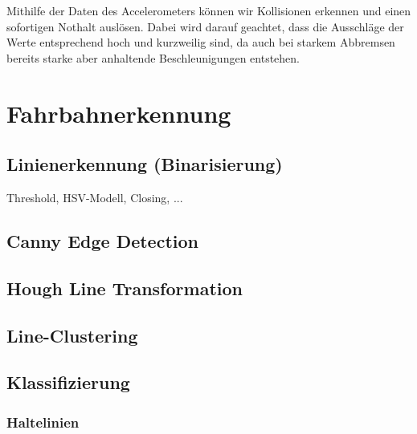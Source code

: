 \documentclass[a4paper,12pt]{report}
\begin{document}
		Mithilfe der Daten des Accelerometers können wir Kollisionen erkennen und einen sofortigen Nothalt auslösen.
		Dabei wird darauf geachtet, dass die Ausschläge der Werte entsprechend hoch und kurzweilig sind, da auch bei starkem Abbremsen bereits starke aber anhaltende Beschleunigungen entstehen.
	
	\chapter{Fahrbahnerkennung}
	
	\section{Linienerkennung (Binarisierung)}
	Threshold, HSV-Modell, Closing, ...
	
	\section{Canny Edge Detection} %
	
	\section{Hough Line Transformation}
	
	\section{Line-Clustering}
	
	\section{Klassifizierung}
	
	\subsection{Haltelinien}
	
\end{document}
